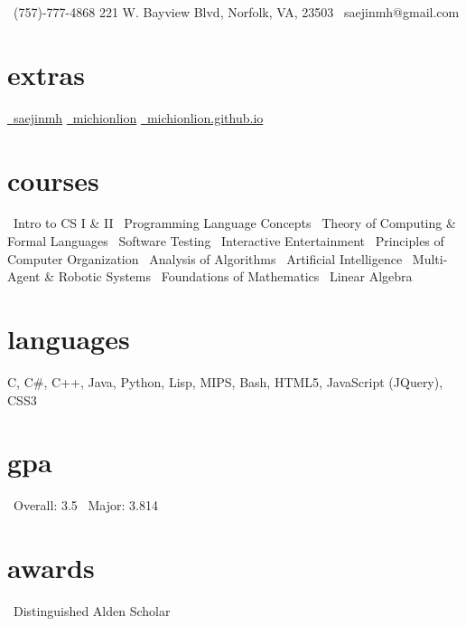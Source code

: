 \documentclass[]{friggeri-cv}
\begin{document}
       {\faMobilePhone\ (757)-777-4868 \hspace{1cm} 221 W. Bayview Blvd, Norfolk, VA, 23503 \hspace{1cm} \faEnvelope\ saejinmh@gmail.com}

\begin{aside}
  \section{extras}
    \href{https://www.linkedin.com/in/saejinmh}{\faLinkedin\ saejinmh}\vspace{0.03cm}
    \href{https://github.com/Michionlion}{\faGithub\ michionlion}\vspace{0.03cm}
    \href{https://michionlion.github.io}{\faGlobe\ michionlion.github.io}\vspace{0.03cm}
  \section{courses}
	\bullet\ Intro to CS I \& II\vspace{0.1cm}
	\bullet\ Programming Language Concepts\vspace{0.1cm}
	\bullet\ Theory of Computing \& Formal Languages\vspace{0.1cm}	
	\bullet\ Software Testing\vspace{0.1cm}
	\bullet\ Interactive Entertainment\vspace{0.1cm}
	\bullet\ Principles of Computer Organization\vspace{0.1cm}
    \bullet\ Analysis of Algorithms\vspace{0.1cm}
    \bullet\ Artificial Intelligence\vspace{0.1cm}
    \bullet\ Multi-Agent \& Robotic Systems\vspace{0.1cm}
    \bullet\ Foundations of Mathematics\vspace{0.1cm}
    \bullet\ Linear Algebra\vspace{0.1cm}
  \section{languages}
    C, C\#, C++, Java, Python, Lisp, MIPS, Bash, HTML5, JavaScript (JQuery), CSS3\vspace{0.1cm}
  \section{gpa}
  	\bullet\ Overall: 3.5\vspace{0.1cm}
  	\bullet\ Major: 3.814\vspace{0.1cm}
  \section{awards}
    \bullet\ Distinguished Alden Scholar\vspace{0.1cm}
\end{aside}
\end{document}
